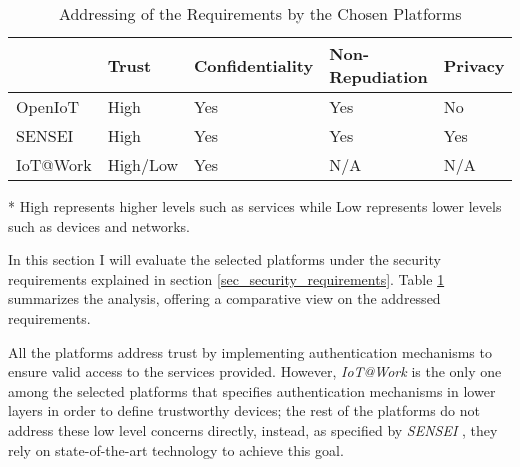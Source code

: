 \documentclass[journal]{IEEEtran}
\begin{document}
  \begin{table}[!t]
    \begin{threeparttable}
      \renewcommand{\arraystretch}{1.3}    
      \caption{Addressing of the Requirements by the Chosen Platforms}
      \label{evaluation_table}        
      \begin{tabular} {
                        p{1cm}
                        >{\centering\arraybackslash}p{1.3cm}
                        >{\centering\arraybackslash}p{1.5cm}
                        >{\centering\arraybackslash}p{2cm}
                        >{\centering\arraybackslash}p{1cm}
                      }
        \hline      
                     & Trust \tnote{*}      & Confidentiality & Non-Repudiation & Privacy \\
        \hline
        OpenIoT      & High       & Yes             & Yes             & No      \\
        SENSEI       & High       & Yes             & Yes             & Yes     \\
        IoT@Work     & High/Low   & Yes             & N/A             & N/A     \\ 
        \hline      
      \end{tabular}
      \begin{tablenotes}
      \item[*] High represents higher levels such as services while Low represents lower levels such as devices and networks.
      \end{tablenotes}
    \end{threeparttable}
  \end{table}

  In this section I will evaluate the selected platforms under the security requirements explained in section \ref{sec_security_requirements}. Table \ref{evaluation_table} summarizes the analysis, offering a comparative view on the addressed requirements. 
  
  All the platforms address trust by implementing authentication mechanisms to ensure valid access to the services provided. However, \emph{IoT@Work} is the only one among the selected platforms that specifies authentication mechanisms in lower layers in order to define trustworthy devices; the rest of the platforms do not address these low level concerns directly, instead, as specified by \emph{SENSEI} \cite{Bauge2010}, they rely on state-of-the-art technology to achieve this goal.
\end{document}

